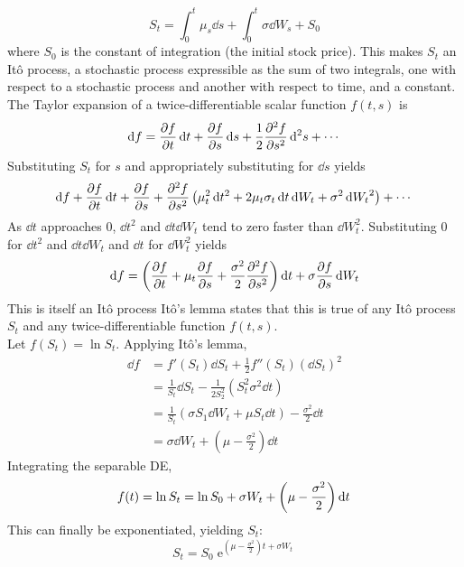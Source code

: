 \documentclass[12pt, A4]{article}
\DeclareMathOperator{\en}{e}
\begin{document}
			\[S_t = \int_0^t\mu_s\dd{s} + \int_0^t\sigma\dd{W}_s + S_0\]
			where \(S_0\) is the constant of integration (the initial stock price). This makes \(S_t\) an It\^o process, a stochastic process expressible as the sum of two integrals, one with respect to a stochastic process and another with respect to time, and a constant. \\
		The Taylor expansion of a twice-differentiable scalar function \(f(t, s)\) is
			\[\dd{f} = \pdv{f}{t}\dd{t} + \pdv{f}{s}\dd{s} + \frac{1}{2}\pdv[2]{f}{s}\dd[2]{s} + \cdots\]
			Substituting \(S_t\) for \(s\) and appropriately substituting for \(\dd{s}\) yields
			\[\dd{f} + \pdv{f}{t}\dd{t} + \pdv{f}{s} (\mu_t\dd{t} + \sigma\dd{W_t}) + \pdv[2]{f}{s}\left(\mu_t^2\dd{t^2} + 2\mu_t\sigma_t\dd{t}\dd{W_t} + \sigma^2\dd{W_t}^2\right) + \cdots\]
			As \(\dd{t}\) approaches 0, \(\dd{t}^2\) and \(\dd{t}\dd{W_t}\) tend to zero faster than \(\dd{W_t^2}\). Substituting 0 for \(\dd{t^2}\) and \(\dd{t}\dd{W_t}\) and \(\dd{t}\) for \(\dd{W_t^2}\) yields
			\[\dd{f} = \left(\pdv{f}{t} + \mu_t\pdv{f}{s} + \frac{\sigma^2}{2}\pdv[2]{f}{s}\right)\dd{t} + \sigma\pdv{f}{s}\dd{W_t}\]
			This is itself an It\^o process It\^o's lemma states that this is true of any It\^o process \(S_t\) and any twice-differentiable function \(f(t, s)\). \\
		Let \(f(S_t) = \ln S_t\). Applying It\^o's lemma,
			\begin{align*}
				\dd{f} &= f'(S_t)\dd{S_t} + \frac{1}{2}f''(S_t)(\dd{S_t})^2 \\
					&= \frac{1}{S_t}\dd{S_t} - \frac{1}{2S_2^2}\left(S_t^2\sigma^2\dd{t}\right) \\
					&= \frac{1}{S_t}(\sigma S_1 \dd{W_t} + \mu S_t \dd{t}) - \frac{\sigma^2}{2}\dd{t} \\
					&= \sigma \dd{W_t} + \left(\mu - \frac{\sigma^2}{2}\right)\dd{t}
			\end{align*}
			Integrating the separable DE,
			\[
				f(t) = \ln S_t 
					= \ln S_0 + \sigma W_t + \left(\mu - \frac{\sigma^2}{2}\right)\dd{t} \\
			\]
			This can finally be exponentiated, yielding \(S_t\):
			\[S_t = S_0\en^{\left(\mu - \frac{\sigma^2}{2}\right)t + \sigma W_t}\]
\end{document}
